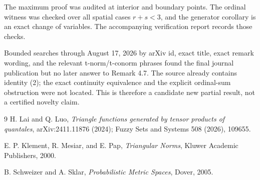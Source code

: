 \documentclass[11pt]{article}
\theoremstyle{remark}
\begin{document}
The maximum proof was audited at interior and boundary points.  The ordinal
witness was checked over all spatial cases \(r+s<3\), and the generator
corollary is an exact change of variables.  The accompanying verification
report records those checks.

Bounded searches through August 17, 2026 by arXiv id, exact title, exact
remark wording, and the relevant t-norm/t-conorm phrases found the final
journal publication but no later answer to Remark 4.7.  The source already
contains identity (2); the exact continuity equivalence and the explicit
ordinal-sum obstruction were not located.  This is therefore a candidate
new partial result, not a certified novelty claim.

\begin{thebibliography}{9}
H. Lai and Q. Luo,
\emph{Triangle functions generated by tensor products of quantales},
arXiv:2411.11876 (2024); Fuzzy Sets and Systems 508 (2026), 109655.

E. P. Klement, R. Mesiar, and E. Pap,
\emph{Triangular Norms}, Kluwer Academic Publishers, 2000.

B. Schweizer and A. Sklar,
\emph{Probabilistic Metric Spaces}, Dover, 2005.
\end{thebibliography}
\end{document}
